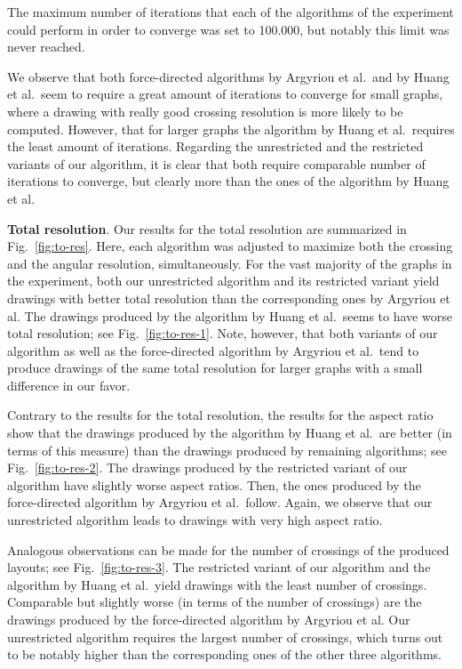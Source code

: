 \documentclass{comjnl}
\newcommand{\myparagraph}[1]{\medskip\noindent\textbf{#1}.}
\begin{document}
The maximum number of iterations that each of the algorithms of the experiment could perform in order to converge was set to 100.000, but notably this limit was never reached. 

We observe that both force-directed algorithms by Argyriou et al.\ and by Huang et al.\ seem to require a great amount of iterations to converge for small graphs, where a drawing with really good crossing resolution is more likely to be computed. However, that for larger graphs the algorithm by Huang et al.\ requires the least amount of iterations. Regarding the unrestricted and the restricted variants of our algorithm, it is clear that both require comparable number of iterations to converge, but clearly more than the ones of the algorithm by Huang et al.

\myparagraph{Total resolution} Our results for the total resolution are summarized in Fig.~\ref{fig:to-res}. Here, each algorithm was adjusted to maximize both the crossing and the angular resolution, simultaneously. For the vast majority of the graphs in the experiment, both our unrestricted algorithm and its restricted variant yield drawings with better total resolution than the corresponding ones by Argyriou et al. The drawings produced by the algorithm by Huang et al.\ seems to have worse total resolution; see Fig.~\ref{fig:to-res-1}. Note, however, that both variants of our algorithm as well as the force-directed algorithm by Argyriou et al.\ tend to produce drawings of the same total resolution for larger graphs with a small difference in our favor.

Contrary to the results for the total resolution, the results for the aspect ratio show that the drawings produced by the algorithm by Huang et al.\ are better (in terms of this measure) than the drawings produced by remaining algorithms; see Fig.~\ref{fig:to-res-2}. 
The drawings produced by the restricted variant of our algorithm have slightly worse aspect ratios. Then, the ones produced by the force-directed algorithm by Argyriou et al.\ follow. Again, we observe that our unrestricted algorithm leads to drawings with very high aspect ratio.

Analogous observations can be made for the number of crossings of the produced layouts; see Fig.~\ref{fig:to-res-3}. The restricted variant of our algorithm and the algorithm by Huang et al.\ yield drawings with the least number of crossings. Comparable but slightly worse (in terms of the number of crossings) are the drawings produced by the force-directed algorithm by Argyriou et al. Our unrestricted algorithm requires the largest number of crossings, which turns out to be notably higher than the corresponding ones of the other three algorithms.
\end{document}
